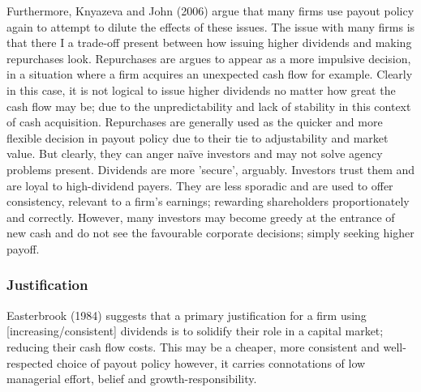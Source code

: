 \documentclass[11pt, english]{article}
\begin{document}
	Furthermore, Knyazeva and John (2006) argue that many firms use payout policy again to attempt to dilute the effects of these issues. The issue with many firms is that there I a trade-off present between how issuing higher dividends and making repurchases look. Repurchases are argues to appear as a more impulsive decision, in a situation where a firm acquires an unexpected cash flow for example. Clearly in this case, it is not logical to issue higher dividends no matter how great the cash flow may be; due to the unpredictability and lack of stability in this context of cash acquisition. Repurchases are generally used as the quicker and more flexible decision in payout policy due to their tie to adjustability and market value. But clearly, they can anger naïve investors and may not solve agency problems present. Dividends are more 'secure', arguably. Investors trust them and are loyal to high-dividend payers. They are less sporadic and are used to offer consistency, relevant to a firm's earnings; rewarding shareholders proportionately and correctly. However, many investors may become greedy at the entrance of new cash and do not see the favourable corporate decisions; simply seeking higher payoff.

		\subsubsection*{Justification}

	Easterbrook (1984) suggests that a primary justification for a firm using [increasing/consistent] dividends is to solidify their role in a capital market; reducing their cash flow costs. This may be a cheaper, more consistent and well- respected choice of payout policy however, it carries connotations of low managerial effort, belief and growth-responsibility.\\
\end{document}
